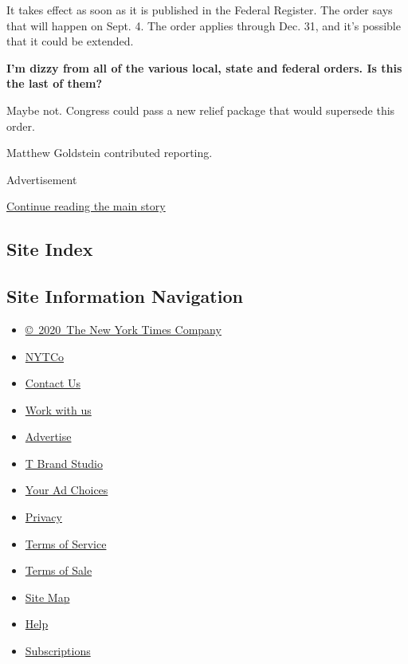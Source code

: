 It takes effect as soon as it is published in the Federal Register. The
order says that will happen on Sept. 4. The order applies through Dec.
31, and it's possible that it could be extended.

\textbf{I'm dizzy from all of the various local, state and federal
orders. Is this the last of them?}

Maybe not. Congress could pass a new relief package that would supersede
this order.

Matthew Goldstein contributed reporting.

Advertisement

\protect\hyperlink{after-bottom}{Continue reading the main story}

\hypertarget{site-index}{%
\subsection{Site Index}\label{site-index}}

\hypertarget{site-information-navigation}{%
\subsection{Site Information
Navigation}\label{site-information-navigation}}

\begin{itemize}
\tightlist
\item
  \href{https://help.nytimes3xbfgragh.onion/hc/en-us/articles/115014792127-Copyright-notice}{©~2020~The
  New York Times Company}
\end{itemize}

\begin{itemize}
\tightlist
\item
  \href{https://www.nytco.com/}{NYTCo}
\item
  \href{https://help.nytimes3xbfgragh.onion/hc/en-us/articles/115015385887-Contact-Us}{Contact
  Us}
\item
  \href{https://www.nytco.com/careers/}{Work with us}
\item
  \href{https://nytmediakit.com/}{Advertise}
\item
  \href{http://www.tbrandstudio.com/}{T Brand Studio}
\item
  \href{https://www.nytimes3xbfgragh.onion/privacy/cookie-policy\#how-do-i-manage-trackers}{Your
  Ad Choices}
\item
  \href{https://www.nytimes3xbfgragh.onion/privacy}{Privacy}
\item
  \href{https://help.nytimes3xbfgragh.onion/hc/en-us/articles/115014893428-Terms-of-service}{Terms
  of Service}
\item
  \href{https://help.nytimes3xbfgragh.onion/hc/en-us/articles/115014893968-Terms-of-sale}{Terms
  of Sale}
\item
  \href{https://spiderbites.nytimes3xbfgragh.onion}{Site Map}
\item
  \href{https://help.nytimes3xbfgragh.onion/hc/en-us}{Help}
\item
  \href{https://www.nytimes3xbfgragh.onion/subscription?campaignId=37WXW}{Subscriptions}
\end{itemize}
